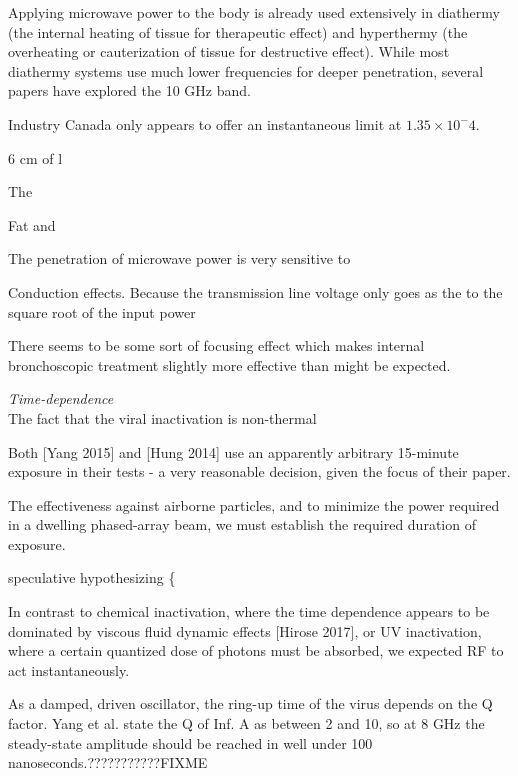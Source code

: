 \documentclass[fleqn,10pt]{article}
\begin{document}
Applying microwave power to the body is already used extensively in diathermy (the internal heating of tissue for therapeutic effect) and hyperthermy (the overheating or cauterization of tissue for destructive effect). While most diathermy systems use much lower frequencies for deeper penetration, several papers have explored the 10 GHz band. 

Industry Canada only appears to offer an instantaneous limit at $1.35 \times 10^-4$.

6 cm of l

The 

Fat and 

The penetration of microwave power is very sensitive to 

Conduction effects. Because the transmission line voltage only goes as the to the square root of the input power

There seems to be some sort of focusing effect which makes internal bronchoscopic treatment slightly more effective than might be expected.

\clearpage
\printbibliography[heading=none, title={}, keyword={standards}]



\clearpage
{\Large \it Time-dependence}\\

The fact that the viral inactivation is non-thermal

Both [Yang 2015] and [Hung 2014] use an apparently arbitrary 15-minute exposure in their tests - a very reasonable decision, given the focus of their paper. 

The effectiveness against airborne particles, and to minimize the power required in a dwelling phased-array beam, we must establish the required duration of exposure.

{\color{red} speculative hypothesizing \{ } 

In contrast to chemical inactivation, where the time dependence appears to be dominated by viscous fluid dynamic effects [Hirose 2017], or UV inactivation, where a certain quantized dose of photons must be absorbed, we expected RF to act instantaneously.

As a damped, driven oscillator, the ring-up time of the virus depends on the Q factor. Yang et al. state the Q of Inf. A as between 2 and 10, so at 8 GHz the steady-state amplitude should be reached in well under 100 nanoseconds.???????????FIXME
\end{document}
